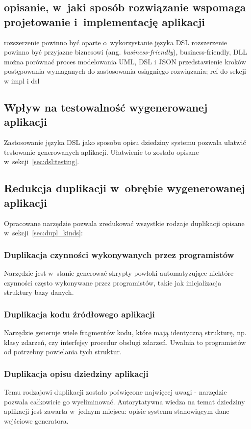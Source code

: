 \subsection{opisanie, w~jaki sposób rozwiązanie wspomaga projetowanie i~implementację aplikacji}

rozszerzenie powinno być oparte o~wykorzystanie języka DSL
rozszerzenie powinno być przyjazne biznesowi (ang. \emph{business-friendly}),
business-friendly, DLL
można porównać proces modelowania UML, DSL i JSON
przedstawienie kroków postępowania wymaganych do zastosowania osiągnięgo rozwiązania; ref do sekcji w impl i dsl


\subsection{Wpływ na testowalność wygenerowanej aplikacji}

Zastosowanie języka DSL jako sposobu opisu dziedziny systemu pozwala ułatwić testowanie generowanych aplikacji.
Ułatwienie to zostało opisane w~sekcji~\ref{sec:dsl:testing}.


\subsection{Redukcja duplikacji w~obrębie wygenerowanej aplikacji}

Opracowane narzędzie pozwala zredukować wszystkie rodzaje duplikacji opisane w~sekcji~\ref{sec:dupl_kinds}:

\subsubsection{Duplikacja czynności wykonywanych przez programistów}
Narzędzie jest w~stanie generować skrypty powłoki automatyzujące niektóre czynności często wykonywane przez programistów, takie jak inicjalizacja struktury bazy danych.

\subsubsection{Duplikacja kodu źródłowego aplikacji}
Narzędzie generuje wiele fragmentów kodu, które mają identyczną strukturę, np. klasy zdarzeń, czy interfejsy procedur obsługi zdarzeń.
Uwalnia to programistów od potrzebny powielania tych struktur.

\subsubsection{Duplikacja opisu dziedziny aplikacji}
Temu rodzajowi duplikacji zostało poświęcone najwięcej uwagi - narzędzie pozwala całkowicie go wyeliminować.
Autorytatywna wiedza na temat dziedziny aplikacji jest zawarta w~jednym miejscu: opisie systemu stanowiącym dane wejściowe generatora.



